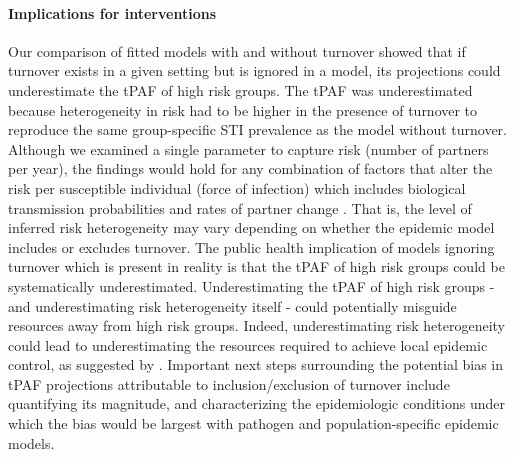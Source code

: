 \paragraph{Implications for interventions}
Our comparison of fitted models with and without turnover
showed that if turnover exists in a given setting
but is ignored in a model, its projections could 
underestimate 
the tPAF of high risk groups.		
The tPAF was underestimated because heterogeneity in risk
had to be higher in the presence of turnover
to reproduce the same group-specific STI prevalence as the model without turnover.
Although we examined a single parameter to capture risk
(number of partners per year),
the findings would hold for any combination of factors
that alter the risk per susceptible individual (force of infection)  
which includes
biological transmission probabilities and rates of partner change \citep{Anderson1991}.
That is, the level of inferred risk heterogeneity may vary depending on whether
the epidemic model includes or excludes turnover.
The public health implication of models ignoring turnover
which is present in reality is that
the tPAF of high risk groups could be systematically underestimated.
Underestimating the tPAF of high risk groups - and underestimating
risk heterogeneity itself - could potentially misguide resources away from high risk groups.
Indeed, underestimating risk heterogeneity could lead to underestimating the resources 
required to achieve local epidemic control, as suggested by \citet{Henry2015}. %
Important next steps surrounding the potential bias in tPAF projections attributable to inclusion/exclusion
of turnover include quantifying its magnitude, 
and characterizing the epidemiologic conditions under which the bias would be largest with 
pathogen and population-specific epidemic models.

